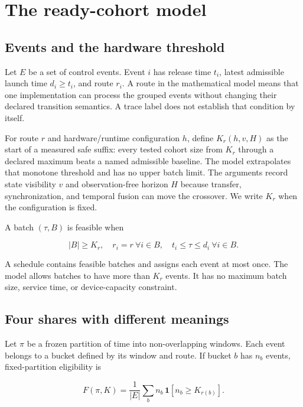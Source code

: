 \section{The ready-cohort model}
\label{sec:model}

\subsection{Events and the hardware threshold}

Let $E$ be a set of control events. Event $i$ has release time $t_i$, latest
admissible launch time $d_i\geq t_i$, and route $r_i$. A route in the
mathematical model means that one implementation can process the grouped events
without changing their declared transition semantics. A trace label does not
establish that condition by itself.

For route $r$ and hardware/runtime configuration $h$, define
$K_r(h,v,H)$ as the start of a measured safe suffix: every tested cohort size
from $K_r$ through a declared maximum beats a named admissible baseline. The
model extrapolates that monotone threshold and has no upper batch limit. The
arguments record state visibility $v$ and observation-free horizon $H$ because
transfer, synchronization, and temporal fusion can move the crossover. We
write $K_r$ when the configuration is fixed.

A batch $(\tau,B)$ is feasible when

\begin{equation}
  |B|\geq K_r,\quad r_i=r\ \forall i\in B,\quad
  t_i\leq\tau\leq d_i\ \forall i\in B.
  \label{eq:feasible-batch}
\end{equation}

A schedule contains feasible batches and assigns each event at most once. The
model allows batches to have more than $K_r$ events. It has no maximum batch
size, service time, or device-capacity constraint.

\subsection{Four shares with different meanings}

Let $\pi$ be a frozen partition of time into non-overlapping windows. Each
event belongs to a bucket defined by its window and route. If bucket $b$ has
$n_b$ events, fixed-partition eligibility is

\begin{equation}
  F(\pi,K)=\frac{1}{|E|}\sum_b n_b\,\mathbf{1}[n_b\geq K_{r(b)}].
  \label{eq:fixed}
\end{equation}

